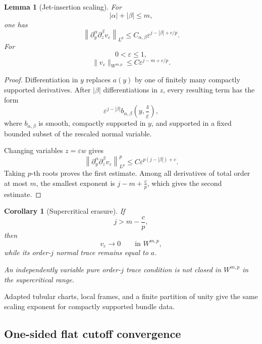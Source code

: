 \documentclass[11pt]{article}
\theoremstyle{plain}
\newtheorem{corollary}[theorem]{Corollary}
\newtheorem{lemma}[theorem]{Lemma}
\theoremstyle{definition}
\begin{document}
\begin{lemma}[Jet-insertion scaling]
\label{lem:general-jet-insertion-scaling}
For
\[
  |\alpha|+|\beta|\leq m,
\]
one has
\[
  \left\|
    \partial_y^\alpha
    \partial_z^\beta
    v_\varepsilon
  \right\|_{L^p}
  \leq
  C_{\alpha,\beta}
  \varepsilon^{j-|\beta|+c/p}.
\]
For
\[
  0<\varepsilon\leq1,
\]
\[
  \boxed{
  \|v_\varepsilon\|_{W^{m,p}}
  \leq
  C
  \varepsilon^{j-m+c/p}.
  }
\]
\end{lemma}

\begin{proof}
Differentiation in \(y\) replaces \(a(y)\) by one of finitely many
compactly supported derivatives. After \(|\beta|\) differentiations in
\(z\), every resulting term has the form
\[
  \varepsilon^{j-|\beta|}
  b_{\alpha,\beta}
  \left(
    y,\frac{z}{\varepsilon}
  \right),
\]
where \(b_{\alpha,\beta}\) is smooth, compactly supported in \(y\), and
supported in a fixed bounded subset of the rescaled normal variable.

Changing variables \(z=\varepsilon w\) gives
\[
  \left\|
    \partial_y^\alpha
    \partial_z^\beta
    v_\varepsilon
  \right\|_{L^p}^p
  \leq
  C
  \varepsilon^{p(j-|\beta|)+c}.
\]
Taking \(p\)-th roots proves the first estimate. Among all derivatives
of total order at most \(m\), the smallest exponent is
\(j-m+\frac{c}{p}\),
which gives the second estimate.
\end{proof}

\begin{corollary}[Supercritical erasure]
\label{cor:supercritical-erasure}
If
\[
  j>m-\frac{c}{p},
\]
then
\[
  v_\varepsilon
  \longrightarrow0
  \qquad
  \text{in }W^{m,p},
\]
while its order-\(j\) normal trace remains equal to \(a\).

An independently variable pure order-\(j\) trace condition is not
closed in \(W^{m,p}\) in the supercritical range.
\end{corollary}

Adapted tubular charts, local frames, and a finite partition of unity give the same scaling exponent for compactly supported bundle data.

\subsection{One-sided flat cutoff convergence}
\label{appsubsec:flat-cutoff-convergence}
\end{document}
